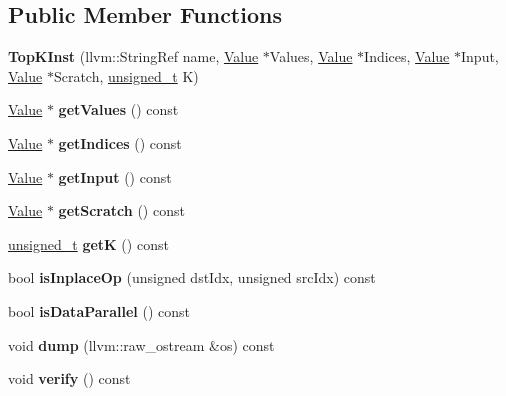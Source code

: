 \subsection*{Public Member Functions}
\begin{DoxyCompactItemize}
\item 
\mbox{\label{classglow_1_1_top_k_inst_a325c6770202b307212861204c4cb6141}} 
{\bfseries Top\+K\+Inst} (llvm\+::\+String\+Ref name, \hyperlink{classglow_1_1_value}{Value} $\ast$Values, \hyperlink{classglow_1_1_value}{Value} $\ast$Indices, \hyperlink{classglow_1_1_value}{Value} $\ast$Input, \hyperlink{classglow_1_1_value}{Value} $\ast$Scratch, \hyperlink{namespaceglow_a0ca574644e1e42ef193a9947fb4d8911}{unsigned\+\_\+t} K)
\item 
\mbox{\label{classglow_1_1_top_k_inst_a80023ae11f8c2251faa5e3dbb69dcdd7}} 
\hyperlink{classglow_1_1_value}{Value} $\ast$ {\bfseries get\+Values} () const
\item 
\mbox{\label{classglow_1_1_top_k_inst_af21aef49f169d655a582b790c227a27e}} 
\hyperlink{classglow_1_1_value}{Value} $\ast$ {\bfseries get\+Indices} () const
\item 
\mbox{\label{classglow_1_1_top_k_inst_a748f490170eb1cdc2f58baaeafe6a342}} 
\hyperlink{classglow_1_1_value}{Value} $\ast$ {\bfseries get\+Input} () const
\item 
\mbox{\label{classglow_1_1_top_k_inst_af797098605215627764a0a46ba38634b}} 
\hyperlink{classglow_1_1_value}{Value} $\ast$ {\bfseries get\+Scratch} () const
\item 
\mbox{\label{classglow_1_1_top_k_inst_a88499ecd8d91a4501aebeb42423f253d}} 
\hyperlink{namespaceglow_a0ca574644e1e42ef193a9947fb4d8911}{unsigned\+\_\+t} {\bfseries getK} () const
\item 
\mbox{\label{classglow_1_1_top_k_inst_a5de28d0ce912e605874bdc1599c8f499}} 
bool {\bfseries is\+Inplace\+Op} (unsigned dst\+Idx, unsigned src\+Idx) const
\item 
\mbox{\label{classglow_1_1_top_k_inst_a383f4ffa7d99f8489b0935a34d38db9c}} 
bool {\bfseries is\+Data\+Parallel} () const
\item 
\mbox{\label{classglow_1_1_top_k_inst_a1ef86f823b6730155b6c187a677b9f7e}} 
void {\bfseries dump} (llvm\+::raw\+\_\+ostream \&os) const
\item 
\mbox{\label{classglow_1_1_top_k_inst_a21594ec0d923d2d2e33e141a9c27b168}} 
void {\bfseries verify} () const
\end{DoxyCompactItemize}
